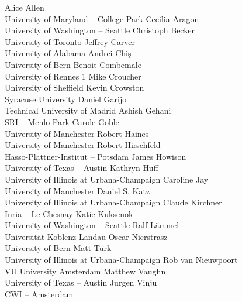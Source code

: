 \documentclass[a4paper,UKenglish]{dagman}
\begin{document}
\begin{participants}
\participant Alice Allen\\ University of Maryland -- College Park
\participant Cecilia Aragon\\ University of Washington -- Seattle
\participant Christoph Becker\\ University of Toronto
\participant Jeffrey Carver\\ University of Alabama
\participant Andrei Chi\c{s}\\ University of Bern
\participant Benoit Combemale\\ University of Rennes 1
\participant Mike Croucher\\ University of Sheffield
\participant Kevin Crowston\\ Syracuse University
\participant Daniel Garijo\\ Technical University of Madrid
\participant Ashish Gehani\\ SRI -- Menlo Park
\participant Carole Goble\\ University of Manchester
\participant Robert Haines\\ University of Manchester
\participant Robert Hirschfeld\\ Hasso-Plattner-Institut -- Potsdam
\participant James Howison\\ University of Texas -- Austin
\participant Kathryn Huff\\ University of Illinois at Urbana-Champaign
\participant Caroline Jay\\ University of Manchester
\participant Daniel S. Katz\\ University of Illinois at Urbana-Champaign
\participant Claude Kirchner\\ Inria -- Le Chesnay
\participant Katie Kuksenok\\ University of Washington -- Seattle
\participant Ralf L\"ammel\\ Universit\"at Koblenz-Landau
\participant Oscar Nierstrasz\\ University of Bern
\participant Matt Turk\\ University of Illinois at Urbana-Champaign
\participant Rob van Nieuwpoort\\ VU University Amsterdam
\participant Matthew Vaughn\\ University of Texas -- Austin
\participant Jurgen Vinju\\ CWI -- Amsterdam
\end{participants}
\end{document}
